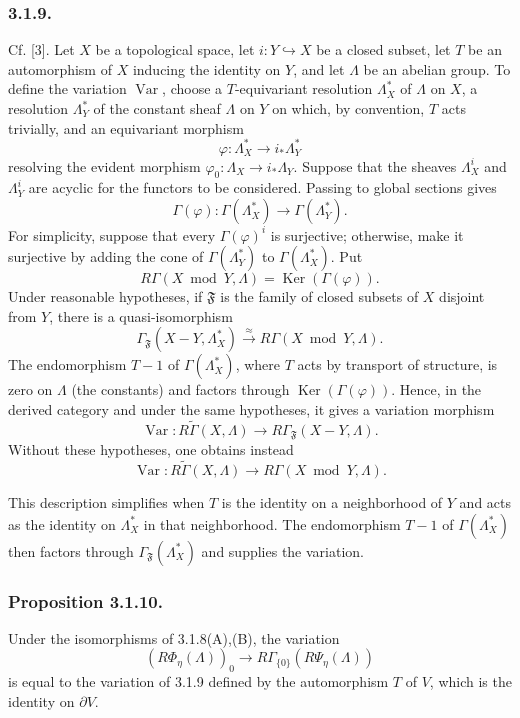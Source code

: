 \subsubsection*{3.1.9.}
Cf. [3].  Let $X$ be a topological space, let
$i:Y\hookrightarrow X$ be a closed subset, let $T$ be an
automorphism of $X$ inducing the identity on $Y$, and let $\Lambda$ be
an abelian group.  To define the variation $\operatorname{Var}$,
choose a $T$-equivariant resolution $\Lambda_X^*$ of $\Lambda$ on
$X$, a resolution $\Lambda_Y^*$ of the constant sheaf $\Lambda$ on
$Y$ on which, by convention, $T$ acts trivially, and an equivariant
morphism
\[
\varphi:\Lambda_X^*\longrightarrow i_*\Lambda_Y^*
\]
resolving the evident morphism
$\varphi_0:\Lambda_X\to i_*\Lambda_Y$.  Suppose that the sheaves
$\Lambda_X^i$ and $\Lambda_Y^i$ are acyclic for the functors to be
considered.  Passing to global sections gives
\[
\Gamma(\varphi):\Gamma(\Lambda_X^*)
\longrightarrow\Gamma(\Lambda_Y^*).
\]
For simplicity, suppose that every $\Gamma(\varphi)^i$ is surjective;
otherwise, make it surjective by adding the cone of
$\Gamma(\Lambda_Y^*)$ to $\Gamma(\Lambda_X^*)$.  Put
\[
R\Gamma(X\bmod Y,\Lambda)=\operatorname{Ker}(\Gamma(\varphi)).
\]
Under reasonable hypotheses, if $\mathfrak F$ is the family of closed
subsets of $X$ disjoint from $Y$, there is a quasi-isomorphism
\[
\Gamma_{\mathfrak F}(X-Y,\Lambda_X^*)
\xrightarrow{\ \approx\ }R\Gamma(X\bmod Y,\Lambda).
\]
The endomorphism $T-1$ of $\Gamma(\Lambda_X^*)$, where $T$ acts by
transport of structure, is zero on $\Lambda$ (the constants) and
factors through $\operatorname{Ker}(\Gamma(\varphi))$.  Hence, in the
derived category and under the same hypotheses, it gives a variation
morphism
\[
\operatorname{Var}:R\widetilde\Gamma(X,\Lambda)
\longrightarrow R\Gamma_{\mathfrak F}(X-Y,\Lambda).
\]
Without these hypotheses, one obtains instead
\[
\operatorname{Var}:R\widetilde\Gamma(X,\Lambda)
\longrightarrow R\Gamma(X\bmod Y,\Lambda).
\]

This description simplifies when $T$ is the identity on a
neighborhood of $Y$ and acts as the identity on $\Lambda_X^*$ in that
neighborhood.  The endomorphism $T-1$ of $\Gamma(\Lambda_X^*)$ then
factors through $\Gamma_{\mathfrak F}(\Lambda_X^*)$ and supplies the
variation.

\subsubsection*{Proposition 3.1.10.}
Under the isomorphisms of 3.1.8(A),(B), the variation
\[
(R\Phi_\eta(\Lambda))_0
\longrightarrow R\Gamma_{\{0\}}(R\Psi_\eta(\Lambda))
\]
is equal to the variation of 3.1.9 defined by the automorphism $T$ of
$V$, which is the identity on $\partial V$.

